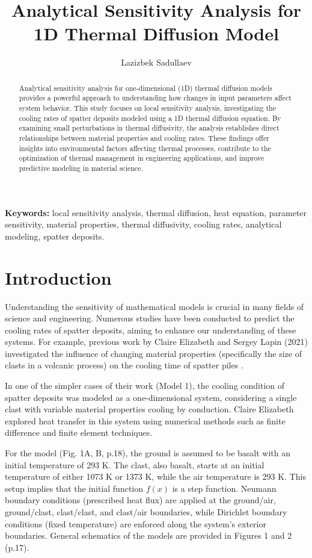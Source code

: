 \documentclass[a4paper,15pt]{article} %
\title{Analytical Sensitivity Analysis for 1D Thermal Diffusion Model}
\author{Lazizbek Sadullaev}
\begin{document}
\maketitle

\begin{abstract}
Analytical sensitivity analysis for one-dimensional (1D) thermal diffusion models provides a powerful approach to understanding how changes in input parameters affect system behavior. This study focuses on local sensitivity analysis, investigating the cooling rates of spatter deposits modeled using a 1D thermal diffusion equation. By examining small perturbations in thermal diffusivity, the analysis establishes direct relationships between material properties and cooling rates. These findings offer insights into environmental factors affecting thermal processes, contribute to the optimization of thermal management in engineering applications, and improve predictive modeling in material science.
\end{abstract}

\noindent\textbf{Keywords:} local sensitivity analysis, thermal diffusion, heat equation, parameter sensitivity, material properties, thermal diffusivity, cooling rates, analytical modeling, spatter deposits.

\section{Introduction}

Understanding the sensitivity of mathematical models is crucial in many fields of science and engineering. Numerous studies have been conducted to predict the cooling rates of spatter deposits, aiming to enhance our understanding of these systems. For example, previous work by Claire Elizabeth and Sergey Lapin (2021) investigated the influence of changing material properties (specifically the size of clasts in a volcanic process) on the cooling time of spatter piles \cite{puleio_project}.

In one of the simpler cases of their work (Model 1), the cooling condition of spatter deposits was modeled as a one-dimensional system, considering a single clast with variable material properties cooling by conduction. Claire Elizabeth explored heat transfer in this system using numerical methods such as finite difference and finite element techniques.

For the model (Fig. 1A, B, p.18), the ground is assumed to be basalt with an initial temperature of 293 K. The clast, also basalt, starts at an initial temperature of either 1073 K or 1373 K, while the air temperature is 293 K. This setup implies that the initial function \( f(x) \) is a step function. Neumann boundary conditions (prescribed heat flux) are applied at the ground/air, ground/clast, clast/clast, and clast/air boundaries, while Dirichlet boundary conditions (fixed temperature) are enforced along the system's exterior boundaries. General schematics of the models are provided in Figures 1 and 2 (p.17).
\end{document}
